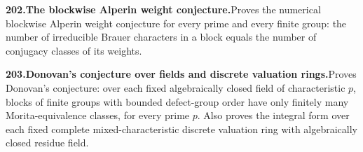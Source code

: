 \documentclass[11pt,a4paper]{article}
\begin{document}
  \par \begin{minipage}{\linewidth}
  \fontsize{10.5}{12.6}\selectfont\RaggedRight
  \hypertarget{result 202}{}
  {\bfseries\textcolor{muted}{202.}\enspace The blockwise Alperin weight conjecture.}\enspace Proves the numerical blockwise Alperin weight conjecture for every prime and every finite group: the number of irreducible Brauer characters in a block equals the number of conjugacy classes of its weights.\par
  \end{minipage}\par\vspace{5pt}



  \par \begin{minipage}{\linewidth}
  \fontsize{10.5}{12.6}\selectfont\RaggedRight
  \hypertarget{result 203}{}
  {\bfseries\textcolor{muted}{203.}\enspace Donovan's conjecture over fields and discrete valuation rings.}\enspace Proves Donovan's conjecture: over each fixed algebraically closed field of characteristic $p$, blocks of finite groups with bounded defect-group order have only finitely many Morita-equivalence classes, for every prime $p$. Also proves the integral form over each fixed complete mixed-characteristic discrete valuation ring with algebraically closed residue field.\par
  \end{minipage}\par\vspace{5pt}
\end{document}
